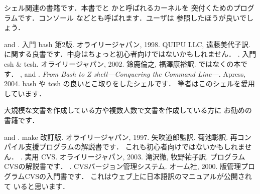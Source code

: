 シェル関連の書籍です．本書でと
かと呼ばれるカーネルを
突付くためのプログラムです．コンソール
などとも呼ばれます．\unixos ユーザは
参照したほうが良いでしょう．%
\begin{myreferences}
 and . \newblock
入門 bash 第2版.
オライリージャパン, 1998.
QUIPU LLC, 遠藤美代子訳.
\sanko
{}に関する良書です．中身はちょっと初心者向けではないかもしれません．
%
. \newblock
入門 csh \& tcsh.
オライリージャパン, 2002.
鈴鹿倫之, 福澤康裕訳.
\sanko
{}ではなくの本です．
%
 ,  and
 . \newblock 
 {\em From Bash to Z shell---Conquering the Command Line---}. 
 Apress, 2004. 
 \sanko bash や tcsh の良いとこ取りをしたシェルです．%
 筆者はこのシェルを愛用しています．
\end{myreferences}

大規模な文書を作成している方や複数人数で文書を作成している方に
お勧めの書籍です．
\begin{myreferences}
 and . \newblock
make 改訂版.
オライリージャパン, 1997.
矢吹道郎監訳. 菊池彰訳.
\sanko
再コンパイル支援プログラムの解説書です．
これも初心者向けではないかもしれません．
%
. \newblock
実用 CVS.
オライリージャパン, 2003.
滝沢徹, 牧野祐子訳.
\sanko
{}プログラムCVSの解説書です．
%
. \newblock
CVS\zdash バージョン管理システム\zdash .
オーム社, 2000.
\sanko
版管理プログラムCVSの入門書です．
これはウェブ上に日本語訳のマニュアルが公開されて
いると思います．
\end{myreferences}
%

